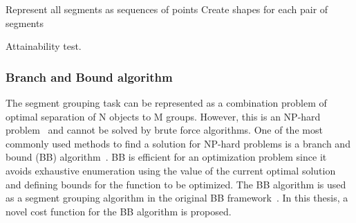 \documentclass{lutmscthesis}[2010/09/22]
\begin{document}
\begin{algorithm} [H]
    \SetAlgoLined
    Represent all segments as sequences of points\;
    Create shapes for each pair of segments\;
    
\caption{Attainability test.}\label{alg:HeuristicIntersection}
\end{algorithm}



\begin{figure}[htp]
\end{figure}


\begin{figure}[htp]
\end{figure}


\subsubsection{Branch and Bound algorithm}
The segment grouping task can be represented as a combination problem of optimal separation of N objects to M groups. However, this is an NP-hard problem~\cite{bubble} and cannot be solved by brute force algorithms. One of the most commonly used methods to find a solution for NP-hard problems is a branch and bound (BB) algorithm~\cite{bubble}.  BB is efficient for an optimization problem since it avoids exhaustive enumeration using the value of the current optimal solution
and defining bounds for the function to be optimized. The BB algorithm is used as a segment grouping algorithm in the original BB framework~\cite{zafari-bb}. In this thesis, a novel cost function for the BB algorithm is proposed.
\end{document}
